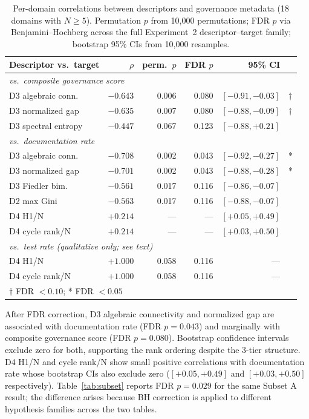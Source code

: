 \documentclass[11pt,a4paper]{article}
\begin{document}
\begin{table}[htb]
\centering
\caption{Per-domain correlations between descriptors and governance
  metadata (18 domains with $N \geq 5$). Permutation $p$ from 10,000
  permutations; FDR $p$ via Benjamini--Hochberg across the full
  Experiment~2 descriptor--target family; bootstrap 95\% CIs from
  10,000 resamples.}
\label{tab:exp2}
\begin{tabular}{lrrrrl}
\toprule
Descriptor vs.\ target & $\rho$ & perm.\ $p$ & FDR $p$ & 95\% CI & \\
\midrule
\multicolumn{6}{l}{\textit{vs.\ composite governance score}} \\
D3 algebraic conn. & $-0.643$ & 0.006 & 0.080 & $[-0.91, -0.03]$ & $\dagger$ \\
D3 normalized gap & $-0.635$ & 0.007 & 0.080 & $[-0.88, -0.09]$ & $\dagger$ \\
D3 spectral entropy & $-0.447$ & 0.067 & 0.123 & $[-0.88, +0.21]$ & \\
\midrule
\multicolumn{6}{l}{\textit{vs.\ documentation rate}} \\
D3 algebraic conn. & $-0.708$ & 0.002 & 0.043 & $[-0.92, -0.27]$ & * \\
D3 normalized gap & $-0.701$ & 0.002 & 0.043 & $[-0.88, -0.28]$ & * \\
D3 Fiedler bim. & $-0.561$ & 0.017 & 0.116 & $[-0.86, -0.07]$ & \\
D2 max Gini & $-0.563$ & 0.017 & 0.116 & $[-0.88, -0.07]$ & \\
D4 H1/N & $+0.214$ & --- & --- & $[+0.05, +0.49]$ & \\
D4 cycle rank/N & $+0.214$ & --- & --- & $[+0.03, +0.50]$ & \\
\midrule
\multicolumn{6}{l}{\textit{vs.\ test rate (qualitative only; see text)}} \\
D4 H1/N & $+1.000$ & 0.058 & 0.116 & --- & \\
D4 cycle rank/N & $+1.000$ & 0.058 & 0.116 & --- & \\
\bottomrule
\multicolumn{6}{l}{\small $\dagger$ FDR $< 0.10$; * FDR $< 0.05$}
\end{tabular}
\end{table}

After FDR correction, D3 algebraic connectivity and normalized gap
are associated with documentation rate (FDR $p = 0.043$) and
marginally with composite governance score (FDR $p = 0.080$). Bootstrap
confidence intervals exclude zero for both, supporting the rank
ordering despite the 3-tier structure. D4 H1/N and cycle rank/N show
small positive correlations with documentation rate whose bootstrap
CIs also exclude zero ($[+0.05, +0.49]$ and $[+0.03, +0.50]$
respectively). Table~\ref{tab:subset} reports FDR $p = 0.029$ for the
same Subset A result; the difference arises because BH correction is
applied to different hypothesis families across the two tables.
\end{document}

